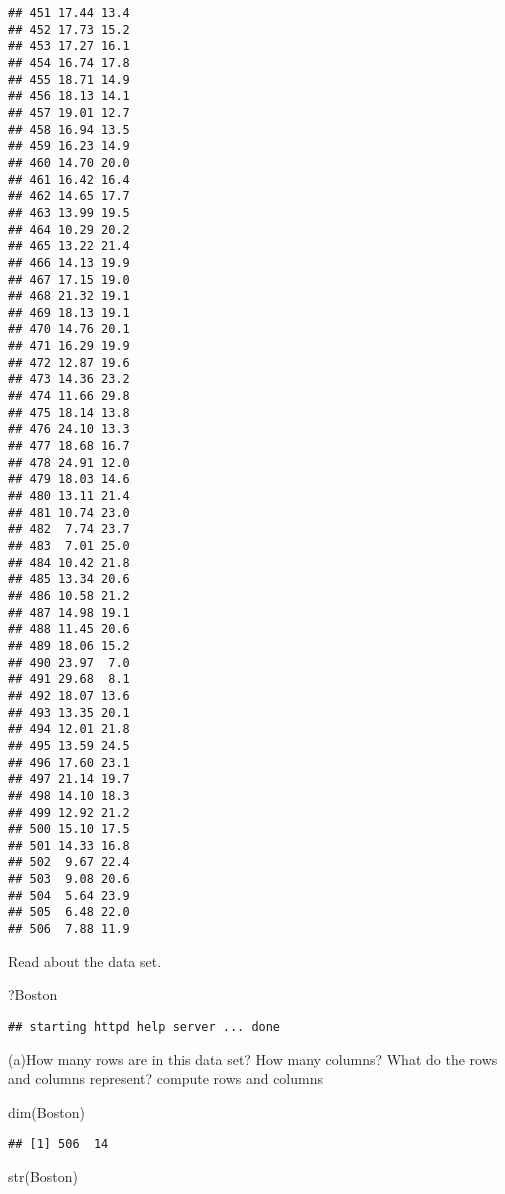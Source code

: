 \documentclass[
]{article}
\newenvironment{Shaded}{\begin{snugshade}}{\end{snugshade}}
\newcommand{\FunctionTok}[1]{\textcolor[rgb]{0.00,0.00,0.00}{#1}}
\newcommand{\NormalTok}[1]{#1}
\begin{document}
\begin{verbatim}
## 451 17.44 13.4
## 452 17.73 15.2
## 453 17.27 16.1
## 454 16.74 17.8
## 455 18.71 14.9
## 456 18.13 14.1
## 457 19.01 12.7
## 458 16.94 13.5
## 459 16.23 14.9
## 460 14.70 20.0
## 461 16.42 16.4
## 462 14.65 17.7
## 463 13.99 19.5
## 464 10.29 20.2
## 465 13.22 21.4
## 466 14.13 19.9
## 467 17.15 19.0
## 468 21.32 19.1
## 469 18.13 19.1
## 470 14.76 20.1
## 471 16.29 19.9
## 472 12.87 19.6
## 473 14.36 23.2
## 474 11.66 29.8
## 475 18.14 13.8
## 476 24.10 13.3
## 477 18.68 16.7
## 478 24.91 12.0
## 479 18.03 14.6
## 480 13.11 21.4
## 481 10.74 23.0
## 482  7.74 23.7
## 483  7.01 25.0
## 484 10.42 21.8
## 485 13.34 20.6
## 486 10.58 21.2
## 487 14.98 19.1
## 488 11.45 20.6
## 489 18.06 15.2
## 490 23.97  7.0
## 491 29.68  8.1
## 492 18.07 13.6
## 493 13.35 20.1
## 494 12.01 21.8
## 495 13.59 24.5
## 496 17.60 23.1
## 497 21.14 19.7
## 498 14.10 18.3
## 499 12.92 21.2
## 500 15.10 17.5
## 501 14.33 16.8
## 502  9.67 22.4
## 503  9.08 20.6
## 504  5.64 23.9
## 505  6.48 22.0
## 506  7.88 11.9
\end{verbatim}

Read about the data set.

\begin{Shaded}
\begin{Highlighting}[]
\NormalTok{?Boston}
\end{Highlighting}
\end{Shaded}

\begin{verbatim}
## starting httpd help server ... done
\end{verbatim}

(a)How many rows are in this data set? How many columns? What do the
rows and columns represent? compute rows and columns

\begin{Shaded}
\begin{Highlighting}[]
\FunctionTok{dim}\NormalTok{(Boston)}
\end{Highlighting}
\end{Shaded}

\begin{verbatim}
## [1] 506  14
\end{verbatim}

\begin{Shaded}
\begin{Highlighting}[]
\FunctionTok{str}\NormalTok{(Boston)}
\end{Highlighting}
\end{Shaded}
\end{document}
